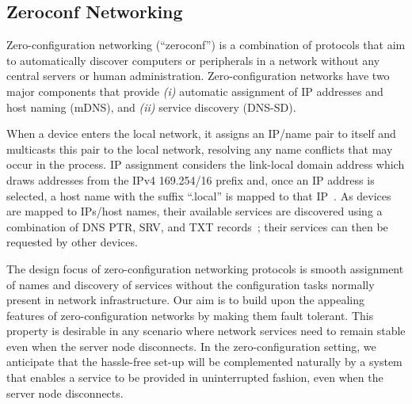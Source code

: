 \subsection{Zeroconf Networking}
\label{sub:background_zeroconf_networking}

Zero-configuration networking (``zeroconf'') is a combination of protocols that aim to automatically discover computers or peripherals in a network without any central servers or human administration. Zero-configuration networks have two major components that provide {\it (i)} automatic assignment of IP addresses and host naming (mDNS), and {\it (ii)} service discovery (DNS-SD).

When a device enters the local network, it assigns an IP/name pair to itself and  multicasts this pair to the local network, resolving any name conflicts that may occur in the process. IP assignment considers the link-local domain address which draws addresses from the IPv4 169.254/16 prefix and, once an IP address is selected, a host name with the suffix ``.local'' is mapped to that IP~\cite{rfc6762}. As devices are mapped to IPs/host names, their available services are discovered using a combination of DNS PTR, SRV, and TXT records~\cite{rfc6763}; their services can then be requested by other devices.

The design focus of zero-configuration networking protocols is smooth assignment of names and discovery of services without the configuration tasks normally present in network infrastructure. 
Our aim is to build upon the appealing features of zero-configuration networks by making them fault tolerant.
This property is desirable in any scenario where network services need to remain stable even when the server node disconnects.
In the zero-configuration setting, we anticipate that the hassle-free set-up will be complemented naturally by a system that enables a service to be provided in uninterrupted fashion, even when the server node disconnects.
